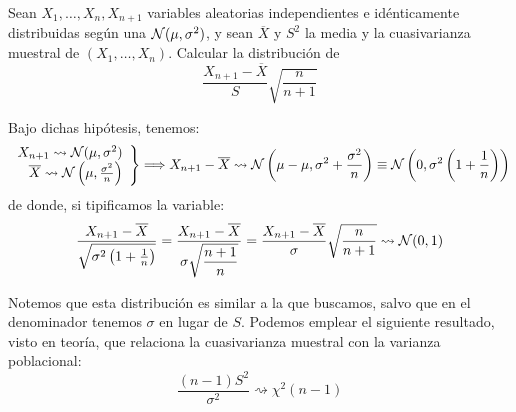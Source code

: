 \begin{ejercicio}
    Sean $X_1, \ldots, X_n, X_{n+1}$ variables aleatorias independientes e idénticamente distribuidas según una $\mathcal{N}(\mu, \sigma^2)$, y sean $\overline{X}$ y $S^2$ la media y la cuasivarianza muestral de $(X_1, \ldots, X_n)$. Calcular la distribución de
    \begin{equation*}
        \dfrac{X_{n+1}- \overline{X}}{S}\sqrt{\dfrac{n}{n+1}}
    \end{equation*}

    \noindent
    Bajo dichas hipótesis, tenemos:
    \begin{equation*}
        \left.\begin{array}{r}
            X_{n+1} \rightsquigarrow \mathcal{N}(\mu, \sigma^2) \\
            \overline{X} \rightsquigarrow \mathcal{N}\left(\mu, \frac{\sigma^2}{n}\right)
    \end{array}\right\}\Longrightarrow X_{n+1}-\overline{X} \rightsquigarrow\mathcal{N}\left(\mu-\mu, \sigma^2 + \frac{\sigma^2}{n}\right) \equiv \mathcal{N}\left(0, \sigma^2\left(1+\frac{1}{n}\right)\right)
    \end{equation*}
    de donde, si tipificamos la variable:
    \begin{equation*}
        \dfrac{X_{n+1}-\overline{X}}{\sqrt{\sigma^2\left(1+\frac{1}{n}\right)}} = \dfrac{X_{n+1}-\overline{X}}{\sigma\sqrt{\dfrac{n+1}{n}}} = \dfrac{X_{n+1}-\overline{X}}{\sigma}\sqrt{\dfrac{n}{n+1}}\rightsquigarrow \mathcal{N}(0,1)
    \end{equation*}

    Notemos que esta distribución es similar a la que buscamos, salvo que en el denominador tenemos $\sigma$ en lugar de $S$. Podemos emplear el siguiente resultado, visto en teoría, que relaciona la cuasivarianza muestral con la varianza poblacional:
    \begin{equation*}
        \dfrac{(n-1)S^2}{\sigma^2} \rightsquigarrow\chi^2(n-1)
    \end{equation*}


\end{ejercicio}
